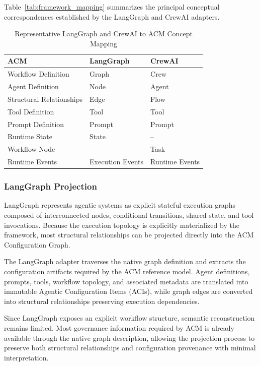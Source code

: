 \documentclass[10pt]{article}
\begin{document}
Table~\ref{tab:framework_mapping} summarizes the principal conceptual correspondences established by the LangGraph and CrewAI adapters.

\begin{table}[ht]
\centering
\caption{Representative LangGraph and CrewAI to ACM Concept Mapping}
\label{tab:langgraph_mapping}
\begin{tabular}{lll}
	\toprule
	\textbf{ACM} & \textbf{LangGraph} & \textbf{CrewAI} \\
	\midrule
	Workflow Definition & Graph & Crew \\
	Agent Definition & Node &  Agent \\
	Structural Relationships & Edge &  Flow\\
	Tool Definition & Tool & Tool \\
	Prompt Definition & Prompt & Prompt\\
	Runtime State & State & -- \\
	Workflow Node & -- & Task \\
	Runtime Events & Execution Events & Runtime Events \\
	\bottomrule
\end{tabular}
\end{table}


\subsubsection{LangGraph Projection}

LangGraph represents agentic systems as explicit stateful execution graphs composed of interconnected nodes, conditional transitions, shared state, and tool invocations. Because the execution topology is explicitly materialized by the framework, most structural relationships can be projected directly into the ACM Configuration Graph.

The LangGraph adapter traverses the native graph definition and extracts the configuration artifacts required by the ACM reference model. Agent definitions, prompts, tools, workflow topology, and associated metadata are translated into immutable Agentic Configuration Items (ACIs), while graph edges are converted into structural relationships preserving execution dependencies.

Since LangGraph exposes an explicit workflow structure, semantic reconstruction remains limited. Most governance information required by ACM is already available through the native graph description, allowing the projection process to preserve both structural relationships and configuration provenance with minimal interpretation.
\end{document}
